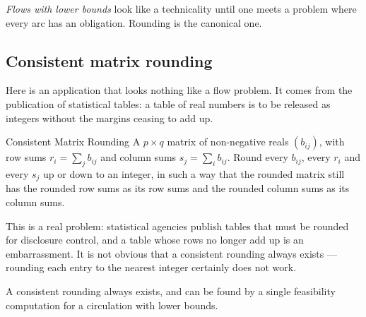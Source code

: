 \emph{Flows with lower bounds} look like a technicality until one meets a
problem where every arc has an obligation. Rounding is the canonical one.

\subsection{Consistent matrix rounding}
\label{sec:flow-matrix-rounding}

Here is an application that looks nothing like a flow problem. It comes from
the publication of statistical tables: a table of real numbers is to be
released as integers without the margins ceasing to add up.

\begin{probdef}{Consistent Matrix Rounding}
  \instance A $p \times q$ matrix of non-negative reals $(b_{ij})$, with row
  sums $r_i = \sum_j b_{ij}$ and column sums $s_j = \sum_i b_{ij}$.
  \goal Round every $b_{ij}$, every $r_i$ and every $s_j$ up or down to an
  integer, in such a way that the rounded matrix still has the rounded row sums
  as its row sums and the rounded column sums as its column sums.
\end{probdef}

This is a real problem: statistical agencies publish tables that must be
rounded for disclosure control, and a table whose rows no longer add up is an
embarrassment. It is not obvious that a consistent rounding always exists ---
rounding each entry to the nearest integer certainly does not work.

\begin{theorem}\label{thm:flow-matrix-rounding}
A consistent rounding always exists, and can be found by a single feasibility
computation for a circulation with lower bounds.
\end{theorem}

